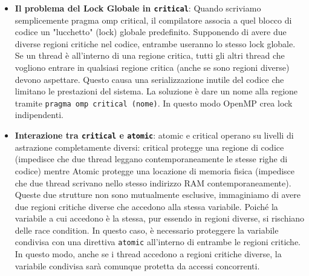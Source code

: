 \begin{itemize}
    \item \textbf{Il problema del Lock Globale in \texttt{critical}}: Quando scriviamo semplicemente pragma omp critical, il compilatore associa a quel blocco di codice un "lucchetto" (lock) globale predefinito. 
    Supponendo di avere due diverse regioni critiche nel codice, entrambe useranno lo stesso lock globale. Se un thread è all'interno di una regione critica, tutti gli altri thread che vogliono entrare in qualsiasi regione critica (anche se sono regioni diverse) devono aspettare.
    Questo causa una serializzazione inutile del codice che limitano le prestazioni del sistema. La soluzione è dare un nome alla regione tramite \texttt{pragma omp critical (nome)}. In questo modo OpenMP crea lock indipendenti.

    \item \textbf{Interazione tra \texttt{critical} e \texttt{atomic}}: atomic e critical operano su livelli di astrazione completamente diversi: critical protegge una regione di codice (impedisce che due thread leggano contemporaneamente le stesse righe di codice) mentre Atomic protegge una locazione di memoria fisica (impedisce che due thread scrivano nello stesso indirizzo RAM contemporaneamente). Queste due strutture non sono mutualmente esclusive, immaginiamo di avere due regioni critiche diverse che accedono alla stessa variabile. Poiché la variabile a cui accedono è la stessa, pur essendo in regioni diverse, si rischiano delle race condition. In questo caso, è necessario proteggere la variabile condivisa con una direttiva \texttt{atomic} all'interno di entrambe le regioni critiche. In questo modo, anche se i thread accedono a regioni critiche diverse, la variabile condivisa sarà comunque protetta da accessi concorrenti.


\end{itemize}
